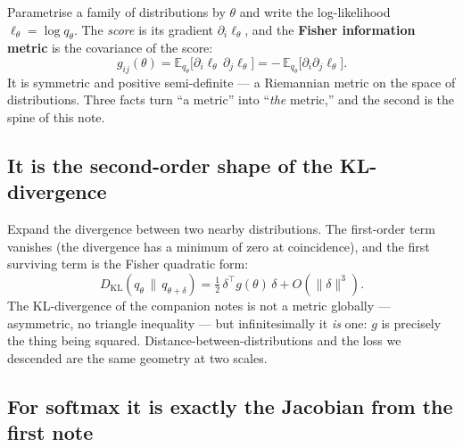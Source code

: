 \documentclass[11pt]{article}
\begin{document}
Parametrise a family of distributions by $\theta$ and write the log-likelihood
$\ell_\theta = \log q_\theta$. The \emph{score} is its gradient $\partial_i \ell_\theta$, and
the \textbf{Fisher information metric} is the covariance of the score:
\[
  g_{ij}(\theta) = \mathbb{E}_{q_\theta}\!\bigl[\partial_i \ell_\theta \,\partial_j \ell_\theta\bigr]
  = -\,\mathbb{E}_{q_\theta}\!\bigl[\partial_i \partial_j \ell_\theta\bigr].
\]
It is symmetric and positive semi-definite --- a Riemannian metric on the space of
distributions. Three facts turn ``a metric'' into ``\emph{the} metric,'' and the second is the
spine of this note.

\subsection*{It is the second-order shape of the KL-divergence}

Expand the divergence between two nearby distributions. The first-order term vanishes (the
divergence has a minimum of zero at coincidence), and the first surviving term is the Fisher
quadratic form:
\[
  D_{\mathrm{KL}}(q_\theta \,\|\, q_{\theta+\delta})
  = \tfrac12\, \delta^{\top} g(\theta)\, \delta + O(\lVert\delta\rVert^3).
\]
The KL-divergence of the companion notes is not a metric globally --- asymmetric, no triangle
inequality --- but infinitesimally it \emph{is} one: $g$ is precisely the thing being squared.
Distance-between-distributions and the loss we descended are the same geometry at two scales.

\subsection*{For softmax it is exactly the Jacobian from the first note}
\end{document}
